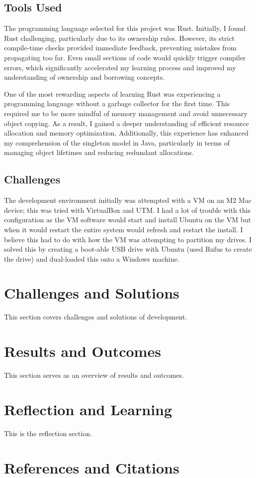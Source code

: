 \documentclass{report}
\begin{document}
\section{Tools Used}
The programming language selected for this project was Rust. Initially, I found Rust challenging, particularly due to its ownership rules. However, its strict compile-time checks provided immediate feedback, preventing mistakes from propagating too far. Even small sections of code would quickly trigger compiler errors, which significantly accelerated my learning process and improved my understanding of ownership and borrowing concepts.  

One of the most rewarding aspects of learning Rust was experiencing a programming language without a garbage collector for the first time. This required me to be more mindful of memory management and avoid unnecessary object copying. As a result, I gained a deeper understanding of efficient resource allocation and memory optimization. Additionally, this experience has enhanced my comprehension of the singleton model in Java, particularly in terms of managing object lifetimes and reducing redundant allocations.

\section*{Challenges}
The development environment initially was attempted with a VM on an M2 Mac device; this was tried with VirtualBox and UTM. I had a lot of trouble with this configuration as the VM software would start and install Ubuntu on the VM but when it would restart the entire system would refresh and restart the install. I believe this had to do with how the VM was attempting to partition my drives. I solved this by creating a boot-able USB drive with Ubuntu (used Rufus to create the drive) and dual-loaded this onto a Windows machine.

\chapter{Challenges and Solutions}
This section covers challenges and solutions of development.

\chapter{Results and Outcomes}
This section serves as an overview of results and outcomes.

\chapter{Reflection and Learning}
This is the reflection section.

\chapter{References and Citations}
\end{document}

